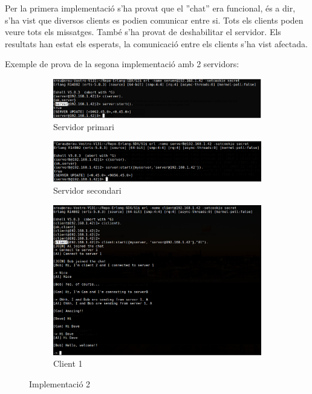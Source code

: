 \documentclass[a4paper, 11pt]{article}
\begin{document}
Per la primera implementació s'ha provat que el ''chat'' era funcional, és a
dir, s'ha vist que diversos clients es podien comunicar entre si. Tots els
clients poden veure tots els missatges.  També s'ha provat de deshabilitar el
servidor. Els resultats han estat els esperats, la comunicació entre els clients
s'ha vist afectada.

Exemple de prova de la segona implementació amb 2 servidors:

\begin{figure}[H]
    \centering
    \begin{subfigure}[b]{0.8\textwidth}
        \includegraphics[width=1.0\textwidth]{figures/ServerA}
        \caption{Servidor primari}
        \label{fig:firstserver}
    \end{subfigure}
    
    \begin{subfigure}[b]{0.8\textwidth}
        \includegraphics[width=1.0\textwidth]{figures/ServerB}
        \caption{Servidor secondari}
        \label{fig:secondserver}
    \end{subfigure}

    \begin{subfigure}[b]{0.8\textwidth}
        \includegraphics[width=1.0\textwidth]{figures/Al}
        \caption{Client 1}
        \label{fig:firstclient}
    \end{subfigure}

    \caption{Implementaci\'o 2}
\end{figure}
\end{document}

